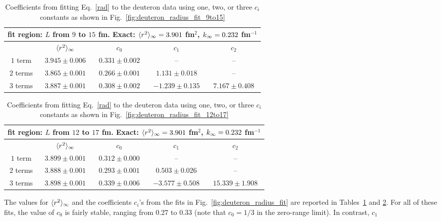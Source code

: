 	\begin{table}[h]
		\begin{tabular}{ |c|c|c|c|c| }
			\hline
	 		\multicolumn{5}{|c|}{fit region: $L$ from $9$ to $15$ fm. Exact:
	 		$\langle r^2 \rangle_{\infty} = 3.901$ fm$^2$, $k_{\infty} = 0.232$ fm$^{-1}$} \\ \hline
			& $\langle r^2 \rangle_{\infty}$ & $c_0$ & $c_1$ & $c_2$ \\ \hline
			$1$ term & $3.945 \pm 0.006$ & $0.331 \pm 0.002$ & -- & -- \\ %
	 		$2$ terms & $3.865 \pm 0.001$ & $0.266 \pm 0.001$ & $1.131 \pm 0.018$ & --
			\\ %
	 		$3$ terms & $3.887 \pm 0.001$ & $0.308 \pm 0.002$ & $-1.239 \pm 0.135$ &
			$7.167 \pm 0.408$ \\ \hline
	 \end{tabular}
	 \caption{Coefficients from fitting Eq.~\eqref{rad} to the deuteron data
	    using one, two, or three $c_i$ constants as shown in
			Fig.~\ref{fig:deuteron_radius_fit_9to15}}
	 \label{tab:coeff_deuteron_radius_fit_9to15}
  \end{table}
	\begin{table}
		\begin{tabular}{ |c|c|c|c|c| }
	  \hline
	  \multicolumn{5}{|c|}{fit region: $L$ from $12$ to $17$ fm. Exact:
		$\langle r^2 \rangle_{\infty} = 3.901$ fm$^2$, $k_{\infty} = 0.232$ fm$^{-1}$} \\ \hline
	  & $\langle r^2 \rangle_{\infty}$ & $c_0$ & $c_1$ & $c_2$ \\ \hline
	  $1$ term & $3.899 \pm 0.001$ & $0.312 \pm 0.000$ & -- & -- \\ %
	  $2$ terms & $3.888 \pm 0.001$ & $0.293 \pm 0.001$ & $0.503 \pm 0.026$ & --
		\\ %
	  $3$ terms & $3.898 \pm 0.001$ & $0.339 \pm 0.006$ & $-3.577 \pm 0.508$ &
		$15.339 \pm 1.908$ \\ \hline
	  \end{tabular}
		\caption{Coefficients from fitting Eq.~\eqref{rad} to the deuteron data
 	    using one, two, or three $c_i$ constants as shown in
 			Fig.~\ref{fig:deuteron_radius_fit_12to17}}
		\label{tab:coeff_deuteron_radius_fit_12to17}
	\end{table}
	The values for $\langle r^2 \rangle_{\infty}$ and the coefficients $c_i$'s from the fits in
	Fig.~\ref{fig:deuteron_radius_fit} are reported in
	Tables~\ref{tab:coeff_deuteron_radius_fit_9to15} and
	\ref{tab:coeff_deuteron_radius_fit_12to17}.
	For all of these fits, the value of $c_0$ is
	fairly stable, ranging from 0.27 to 0.33 (note that
	$c_0 = 1/3$ in the zero-range limit).  In contrast, $c_1$
